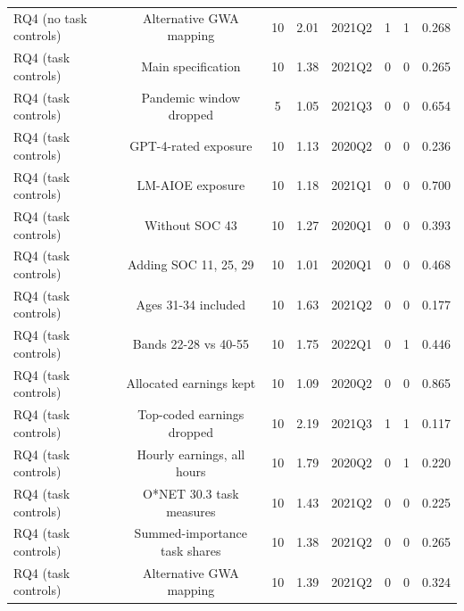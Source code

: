 \begin{table}[htbp]
\begin{tabular}{lccccccc}
RQ4 (no task controls) & Alternative GWA mapping & 10 & 2.01 & 2021Q2 & 1 & 1 & 0.268 \\
RQ4 (task controls) & Main specification & 10 & 1.38 & 2021Q2 & 0 & 0 & 0.265 \\
RQ4 (task controls) & Pandemic window dropped & 5 & 1.05 & 2021Q3 & 0 & 0 & 0.654 \\
RQ4 (task controls) & GPT-4-rated exposure & 10 & 1.13 & 2020Q2 & 0 & 0 & 0.236 \\
RQ4 (task controls) & LM-AIOE exposure & 10 & 1.18 & 2021Q1 & 0 & 0 & 0.700 \\
RQ4 (task controls) & Without SOC 43 & 10 & 1.27 & 2020Q1 & 0 & 0 & 0.393 \\
RQ4 (task controls) & Adding SOC 11, 25, 29 & 10 & 1.01 & 2020Q1 & 0 & 0 & 0.468 \\
RQ4 (task controls) & Ages 31-34 included & 10 & 1.63 & 2021Q2 & 0 & 0 & 0.177 \\
RQ4 (task controls) & Bands 22-28 vs 40-55 & 10 & 1.75 & 2022Q1 & 0 & 1 & 0.446 \\
RQ4 (task controls) & Allocated earnings kept & 10 & 1.09 & 2020Q2 & 0 & 0 & 0.865 \\
RQ4 (task controls) & Top-coded earnings dropped & 10 & 2.19 & 2021Q3 & 1 & 1 & 0.117 \\
RQ4 (task controls) & Hourly earnings, all hours & 10 & 1.79 & 2020Q2 & 0 & 1 & 0.220 \\
RQ4 (task controls) & O*NET 30.3 task measures & 10 & 1.43 & 2021Q2 & 0 & 0 & 0.225 \\
RQ4 (task controls) & Summed-importance task shares & 10 & 1.38 & 2021Q2 & 0 & 0 & 0.265 \\
RQ4 (task controls) & Alternative GWA mapping & 10 & 1.39 & 2021Q2 & 0 & 0 & 0.324 \\
\bottomrule
\end{tabular}
\par\vspace{2pt}{\footnotesize Counts of individually significant pre-period coefficients, the largest $|$estimate/SE$|$, and the p-value of the joint Wald test that all pre-period coefficients are zero (clustered covariance; blank for runs made before step 07 saved it).}
\end{table}
